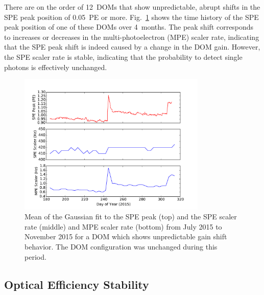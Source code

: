 There are on the
order of 12~DOMs that show unpredictable, abrupt shifts in the SPE peak
position of 0.05~PE or more. Fig.~\ref{fig:gainshift_spe} shows the time history of the
SPE peak position of one of these DOMs over 4~months. The peak shift
corresponds to increases or decreases in the multi-photoelectron (MPE) scaler rate,
indicating that the SPE peak shift is indeed caused by a change in the DOM
gain. However, the SPE scaler rate is stable, indicating that the
probability to detect single photons is effectively unchanged.

\begin{figure}[!h]
 \centering
 \includegraphics[width=0.8\textwidth]{graphics/dom/reliability/gainshift.pdf}
 \caption{Mean of the Gaussian fit to the SPE peak (top) and the SPE
   scaler rate (middle) and MPE
   scaler rate (bottom) from July 2015 to November 2015 for a DOM
   which shows unpredictable gain shift behavior. The DOM
   configuration was unchanged during this period.}
 \label{fig:gainshift_spe}
\end{figure}

\subsection{\label{sec:optical_stability}Optical Efficiency Stability}

